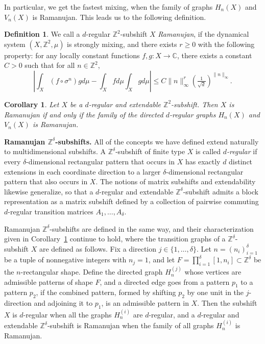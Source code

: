 \documentclass[12pt]{article}
\newtheorem{corollary}{Corollary}[theorem]
\theoremstyle{definition}
\newtheorem{definition}{Definition}
\begin{document}
In particular, we get the fastest mixing, when the family of graphs $H_n(X)$ and $V_n(X)$ is Ramanujan. This leads us to the following definition.

\begin{definition}
We call a $d$-regular $\mathbb{Z}^2$-subshift $X$ \textit{Ramanujan}, if the dynamical system $(X,\mathbb{Z}^2,\mu)$ is strongly mixing, and there exists $r\geq 0$ with the following property: for any locally constant functions $f,g:X\rightarrow\mathbb{C}$, there exists a constant $C>0$ such that for all $n\in\mathbb{Z}^2$,
\[
\left|\int_X (f\circ \sigma^n)gd\mu - \int_Xfd\mu\int_Xgd\mu\right|\leq C\|n\|_\infty^{r}\left(\tfrac{1}{\sqrt{d}}\right)^{\|n\|_\infty}.
\]
\end{definition}

\begin{corollary}\label{cor:RamSubsh_RamGraphs}
Let $X$ be a $d$-regular and extendable $\mathbb{Z}^2$-subshift. Then $X$ is Ramanujan if and only if the family of the directed $d$-regular graphs $H_n(X)$ and $V_n(X)$ is Ramanujan.
\end{corollary}

\vspace{0.2cm}
\textbf{Ramanujan $\mathbb{Z}^{\delta}$-subshifts.}
All of the concepts we have defined extend naturally to multidimensional subshifts. A \(\mathbb{Z}^\delta\)-subshift of finite type \(X\) is called \textit{\(d\)-regular} if every \(\delta\)-dimensional rectangular pattern that occurs in \(X\) has exactly \(d\) distinct extensions in each coordinate direction to a larger \(\delta\)-dimensional rectangular pattern that also occurs in \(X\). The notions of matrix subshifts and extendability likewise generalize, so that a $d$-regular and extendable \(\mathbb{Z}^\delta\)-subshift admits a block representation as a matrix subshift defined by a collection of pairwise commuting $d$-regular transition matrices \(A_1, \ldots, A_\delta\).

Ramanujan $\mathbb{Z}^{\delta}$-subshifts are defined in the same way, and their characterization given in Corollary~\ref{cor:RamSubsh_RamGraphs} continue to hold, where the transition graphs of a $\mathbb{Z}^{\delta}$-subshift $X$ are defined as follows.
Fix a direction $j \in \{1, \ldots, \delta\}$. Let $n=(n_i)_{i=1}^\delta$ be a tuple of nonnegative integers with $n_j=1$, and let $F=\prod_{i=1}^\delta [1,n_i]\subset\mathbb{Z}^{\delta}$ be the $n$-rectangular shape. Define the directed graph $H_n^{(j)}$ whose vertices are admissible patterns of shape $F$, and a directed edge goes from a pattern $p_1$ to a pattern $p_2$, if the combined pattern, formed by shifting $p_2$ by one unit in the $j$-direction and adjoining it to $p_1$, is an admissible pattern in $X$. Then the subshift $X$ is $d$-regular when all the graphs $H_n^{(i)}$ are $d$-regular, and a $d$-regular and extendable $\mathbb{Z}^{\delta}$-subshift is Ramanujan when the family of all graphs $H_n^{(i)}$ is Ramanujan.
\end{document}
